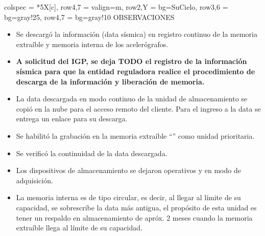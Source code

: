 \begin{longtblr}{
		colspec = {*{5}{X[c]}},
		row{4,7} = {valign=m},
		row{2,Y} = {bg=SuCielo},
		row{3,6} = {bg=gray!25},
		row{4,7} = {bg=gray!10}
	}
	 OBSERVACIONES \\
	 \begin{itemize}
		\item Se descargó la información (data sísmica) en registro continuo de la memoria extraíble y memoria interna de los acelerógrafos.
		\item {\bfseries\color{SuAzul} A solicitud del IGP, se deja TODO el registro de la información sísmica para que la entidad reguladora realice el procedimiento de descarga de la información y liberación de memoria.}
		\item La data descargada en modo continuo de la unidad de almacenamiento se copió en la nube para el acceso remoto del cliente. Para el ingreso a la data se entrega un enlace para su descarga.
		\item Se habilitó la grabación en la memoria extraíble ``'' como unidad prioritaria.
		\item Se verificó la continuidad de la data descargada.
		\item Los dispositivos de almacenamiento se dejaron operativos y en modo de adquisición.
		\item La memoria interna es de tipo circular, es decir, al llegar al límite de su capacidad, se sobrescribe la data más antigua, el propósito de esta unidad es tener un respaldo en almacenamiento de apróx. 2 meses cuando la memoria extraíble llega al límite de su capacidad.
	\end{itemize}
\end{longtblr}
